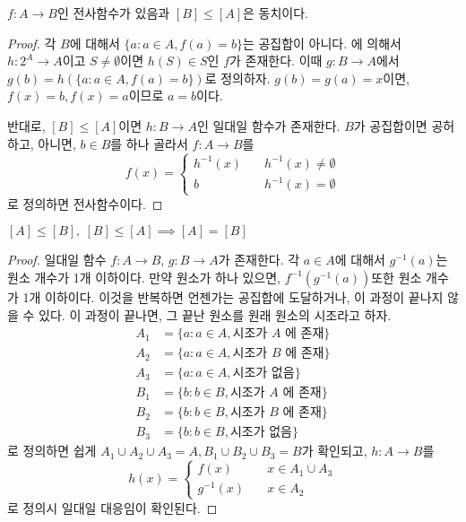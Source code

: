 \begin{lemma}
\label{surjec}
	$f : A \to B$인 전사함수가 있음과 $[B] \leq [A]$은 동치이다.
\end{lemma}
\begin{proof}
	각 $B$에 대해서 $\{a : a \in A, f(a) = b\}$는 공집합이 아니다.
	에 의해서 $h : 2^A \to A$이고 $S \neq \emptyset$이면 $h(S) \in S$인 $f$가 존재한다.
	이때 $g : B \to A$에서 $g(b) = h(\{a : a \in A, f(a) = b\})$로 정의하자.
	$g(b) = g(a) = x$이면, $f(x) = b, f(x) = a$이므로 $a = b$이다. 

	반대로, $[B] \leq [A]$이면 $h : B \to A$인 일대일 함수가 존재한다.
	$B$가 공집합이면 공허하고, 아니면, $b \in B$를 하나 골라서 $f : A \to B$를
	\begin{equation}
		f(x) = \begin{cases}
			h^{-1}(x) \quad &h^{-1}(x) \neq \emptyset \\
			b \quad &h^{-1}(x) = \emptyset
		\end{cases}
	\end{equation}
	로 정의하면 전사함수이다.
\end{proof}
\begin{theorem}
\label{sbt}
	$[A] \leq [B],\: [B] \leq [A] \implies [A] = [B]$
\end{theorem}
\begin{proof}
	일대일 함수 $f : A \to B$, $g : B \to A$가 존재한다.
	각 $a \in A$에 대해서 $g^{-1}(a)$는 원소 개수가 1개 이하이다.
	만약 원소가 하나 있으면, $f^{-1}(g^{-1}(a))$또한 원소 개수가 1개 이하이다.
	이것을 반복하면 언젠가는 공집합에 도달하거나, 이 과정이 끝나지 않을 수 있다.
	이 과정이 끝나면, 그 끝난 원소를 원래 원소의 시조라고 하자.
	\begin{align}
		A_1 &= \{a : a \in A, \text{시조가 }A\text{ 에 존재}\} \\
		A_2 &= \{a : a \in A, \text{시조가 }B\text{ 에 존재}\} \\
		A_3 &= \{a : a \in A, \text{시조가 없음}\} \\
		B_1 &= \{b : b \in B, \text{시조가 }A\text{ 에 존재}\} \\
		B_2 &= \{b : b \in B, \text{시조가 }B\text{ 에 존재}\} \\
		B_3 &= \{b : b \in B, \text{시조가 없음}\}
	\end{align}
	로 정의하면 쉽게 $A_1 \cup A_2 \cup A_3 = A, B_1 \cup B_2 \cup B_3 = B$가 확인되고, $h : A \to B$를 
	\begin{equation}
		h(x) = \begin{cases}
			f(x) \quad &x \in A_1 \cup A_3 \\
			g^{-1}(x) \quad &x \in A_2
		\end{cases}
	\end{equation}
	로 정의시 일대일 대응임이 확인된다.
\end{proof}
